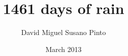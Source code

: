 \documentclass[a4paper,twoside,openright,draft]{memoir}
\author{David Miguel Susano Pinto}
\date{March 2013} %
\title{1461 days of rain} %
\begin{document}
  \frontmatter

  \maketitle

  \clearpage
  \tableofcontents
  \clearpage
  \listoffigures
  \clearpage
  \listoftables

  \clearpage
  \begin{abstract}  %

  \end{abstract}

  \mainmatter

  
  
  
  
  
  
  

  \backmatter

  
%  
\end{document}
